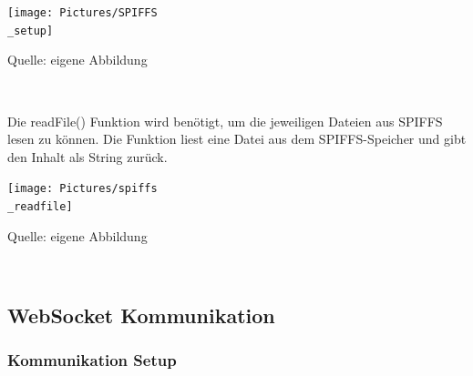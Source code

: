 \documentclass[ngerman,12pt,a4paper]{article}
\begin{document}
	\begin{center}
		\begin{minipage}[t]{0.75\textwidth}
			\texttt{[image: Pictures/SPIFFS\\\_setup]}
			\label{fig:spiffs_init}
			\vspace{-10pt}
			\begin{center}
				\par\small Quelle: eigene Abbildung
			\end{center}
		\end{minipage} \\[0.75cm]
	\end{center}
	Die readFile() Funktion wird benötigt, um die jeweiligen Dateien aus SPIFFS lesen zu können. Die Funktion liest eine Datei aus dem SPIFFS-Speicher und gibt den Inhalt als String zurück.\\
	
	\begin{center}
		\begin{minipage}[t]{0.75\textwidth}
			\texttt{[image: Pictures/spiffs\\\_readfile]}
			\label{fig:spiffs_readfile}
			\vspace{-10pt}
			\begin{center}
				\par\small Quelle: eigene Abbildung
			\end{center}
		\end{minipage} \\[0.75cm]
	\end{center}

	
		\subsection{WebSocket Kommunikation}
		
			\subsubsection{Kommunikation Setup}	
			
\end{document}

